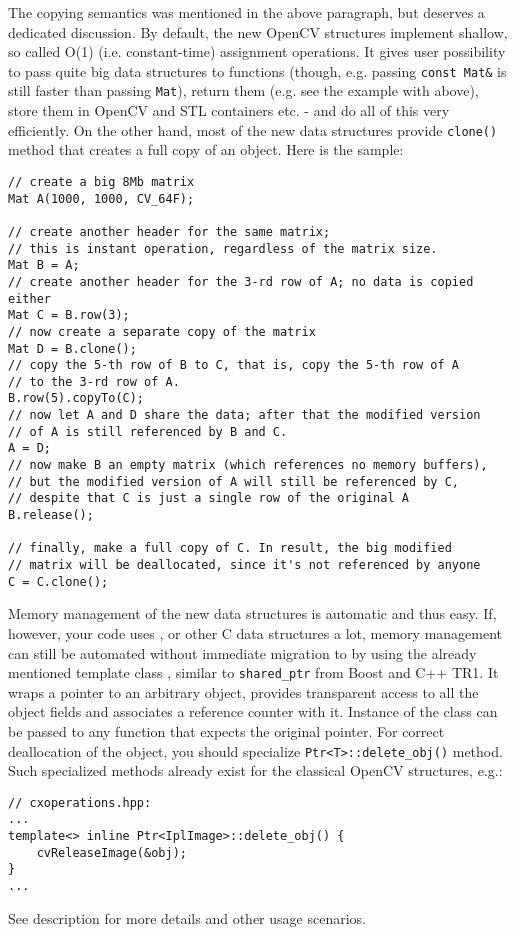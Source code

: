 The copying semantics was mentioned in the above paragraph, but deserves a dedicated discussion.
By default, the new OpenCV structures implement shallow, so called O(1) (i.e. constant-time) assignment operations. It gives user possibility to pass quite big data structures to functions (though, e.g. passing \texttt{const Mat\&} is still faster than passing \texttt{Mat}), return them (e.g. see the example with  above), store them in OpenCV and STL containers etc. - and do all of this very efficiently. On the other hand, most of the new data structures provide \texttt{clone()} method that creates a full copy of an object. Here is the sample:
\begin{lstlisting}
// create a big 8Mb matrix
Mat A(1000, 1000, CV_64F);

// create another header for the same matrix;
// this is instant operation, regardless of the matrix size.
Mat B = A;
// create another header for the 3-rd row of A; no data is copied either
Mat C = B.row(3);
// now create a separate copy of the matrix
Mat D = B.clone();
// copy the 5-th row of B to C, that is, copy the 5-th row of A 
// to the 3-rd row of A.
B.row(5).copyTo(C);
// now let A and D share the data; after that the modified version
// of A is still referenced by B and C.
A = D;
// now make B an empty matrix (which references no memory buffers),
// but the modified version of A will still be referenced by C,
// despite that C is just a single row of the original A
B.release(); 
             
// finally, make a full copy of C. In result, the big modified
// matrix will be deallocated, since it's not referenced by anyone
C = C.clone();
\end{lstlisting}

Memory management of the new data structures is automatic and thus easy. If, however, your code uses ,
 or other C data structures a lot, memory management can still be automated without immediate migration
to  by using the already mentioned template class , similar to \texttt{shared\_ptr} from Boost and C++ TR1.
It wraps a pointer to an arbitrary object, provides transparent access to all the object fields and associates a reference counter with it.
Instance of the class can be passed to any function that expects the original pointer. For correct deallocation of the object, you should specialize \texttt{Ptr<T>::delete\_obj()} method. Such specialized methods already exist for the classical OpenCV structures, e.g.:
\begin{lstlisting}
// cxoperations.hpp:
...
template<> inline Ptr<IplImage>::delete_obj() {
    cvReleaseImage(&obj);
}
...
\end{lstlisting}
See  description for more details and other usage scenarios.


